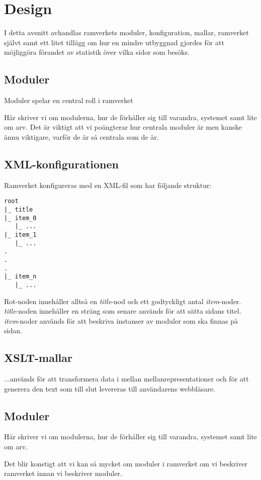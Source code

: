 \section{Design}
I detta avsnitt avhandlas ramverkets moduler, konfiguration, mallar, ramverket
självt samt ett litet tillägg om hur en mindre utbyggnad gjordes för att
möjliggöra förandet av statistik över vilka sidor som besöks.

\subsection{Moduler}
Moduler spelar en central roll i ramverket 

Här skriver vi om modulerna, hur de förhåller sig till varandra, systemet samt
lite om arv. Det är viktigt att vi poängterar hur centrala moduler är men kanske
ännu viktigare, varför de är så centrala som de är.

\subsection{XML-konfigurationen}
Ramverket konfigureras med en XML-fil som har följande struktur:

\begin{verbatim}
root
|_ title
|_ item_0
   |_ ...
|_ item_1
   |_ ...
.
.
.
|_ item_n
   |_ ...
\end{verbatim}

Rot-noden innehåller alltså en {\it title}-nod och ett godtyckligt antal
{\it item}-noder. {\it title}-noden innehåller en sträng som senare används för
att sätta sidans titel. {\it item}-noder används för att beskriva instanser av
moduler som ska finnas på sidan.

\subsection{XSLT-mallar}
...används för att transformera data i mellan mellanrepresentationer och för att
generera den text som till slut levereras till användarens webbläsare.

\subsection{Moduler}
Här skriver vi om modulerna, hur de förhåller sig till varandra, systemet samt
lite om arv.

Det blir konstigt att vi kan så mycket om moduler i ramverket om vi
beskriver ramverket innan vi beskriver moduler.


